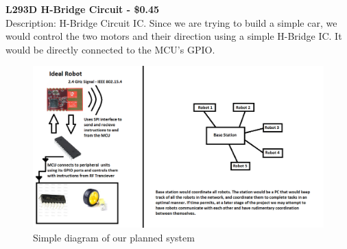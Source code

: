 \documentclass[a4paper]{article}
\begin{document}
	\textbf{L293D H-Bridge Circuit - \$0.45} \\
	Description: H-Bridge Circuit IC. Since we are trying to build a simple car, we would control the two motors and their direction using a simple H-Bridge IC. It would be directly connected to the MCU's GPIO. \\
	\begin{figure}[h]
		\includegraphics[scale=0.5]{../diag.png}
		\caption{Simple diagram of our planned system}
	\end{figure}
\end{document}
